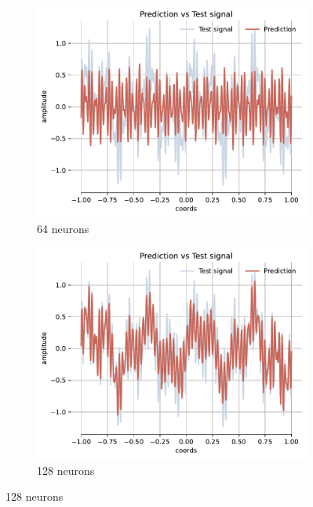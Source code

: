 \begin{figure}[h!]
    \centering
    \begin{subfigure}[b]{0.32\textwidth}
        \centering
        \includegraphics[width=\textwidth]{img/ch3/prediction_w45all_hf64.pdf}
        \caption{64 neurons}
        \label{fig:rec-64-full-45}
    \end{subfigure}
    \hfill
    \begin{subfigure}[b]{0.32\textwidth}
        \centering
        \includegraphics[width=\textwidth]{img/ch3/prediction_w45all_hf128.pdf}
        \caption{128 neurons}
        \label{fig:rec-128-full-45}
    \end{subfigure}

\end{figure}
